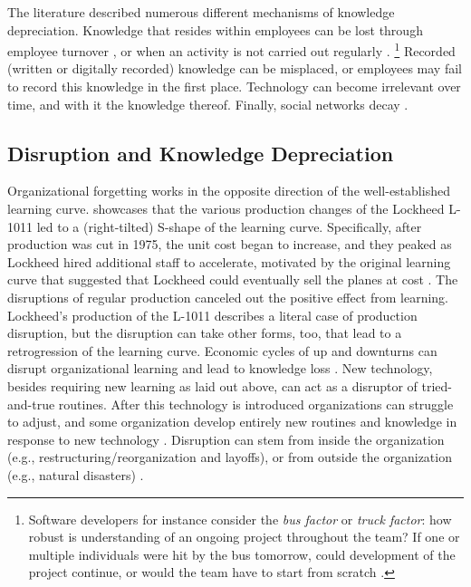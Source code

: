 The literature described numerous different mechanisms of knowledge depreciation. Knowledge that resides within employees can be lost through employee turnover \citep{DeHolan2004, Rao2006}, or when an activity is not carried out regularly \citep{Ramdas2018}. \footnote{Software developers for instance consider the \textit{bus factor} or \textit{truck factor}: how robust is understanding of an ongoing project throughout the team? If one or multiple individuals were hit by the bus tomorrow, could development of the project continue, or would the team have to start from scratch \citep{avelino2016}.} Recorded (written or digitally recorded) knowledge can be misplaced, or employees may fail to record this knowledge in the first place. Technology can become irrelevant over time, and with it the knowledge thereof. Finally, social networks decay \citep{Argote1990,Argote2013_3,Thompson2007}. 

\subsection{Disruption and Knowledge Depreciation}

Organizational forgetting works in the opposite direction of the well-established learning curve. \citet{Benkard2000} showcases that the various production changes of the Lockheed L-1011 led to a (right-tilted) S-shape of the learning curve. Specifically, after production was cut in 1975, the unit cost began to increase, and they peaked as Lockheed hired additional staff to accelerate, motivated by the original learning curve that suggested that Lockheed could eventually sell the planes at cost \citep[pp. 60f.]{Argote2013_3}. The disruptions of regular production canceled out the positive effect from learning. Lockheed's production of the L-1011 describes a literal case of production disruption, but the disruption can take other forms, too, that lead to a retrogression of the learning curve. Economic cycles of up and downturns can disrupt organizational learning and lead to knowledge loss \citep{Rockart2019}. New technology, besides requiring new learning as laid out above, can  act as a disruptor of tried-and-true routines. After this technology is introduced organizations can struggle to adjust, and some organization develop entirely new routines and knowledge in response to new technology \citep{Amburgey1993,Edmondson2001}. Disruption can stem from inside the organization (e.g., restructuring/reorganization and layoffs), or from outside the organization (e.g., natural disasters) \citep{Anderson2014}.